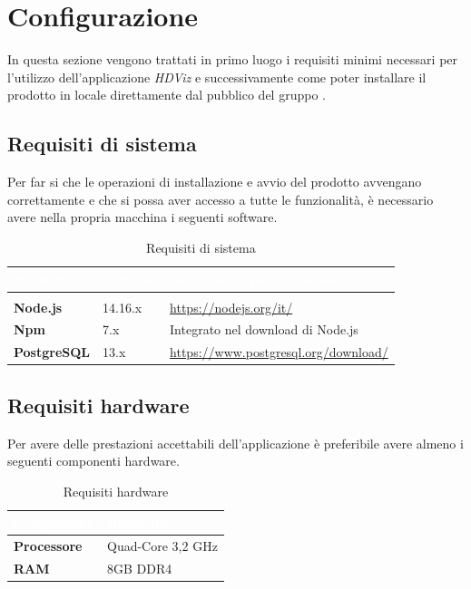 \section{Configurazione}
In questa sezione vengono trattati in primo luogo i requisiti minimi necessari per l'utilizzo dell'applicazione \textit{HDViz} e successivamente come poter installare il prodotto in locale direttamente dal  pubblico  del gruppo \Gruppo{}.  
\subsection{Requisiti di sistema}
Per far si che le operazioni di installazione e avvio del prodotto avvengano correttamente e che si possa aver accesso a tutte le funzionalità, è necessario avere nella propria macchina i seguenti software.
{
\setlength\arrayrulewidth{0.95pt}
\renewcommand{\arraystretch}{1.5}
\begin{longtable}{C{3cm} | C{3cm} | C{9cm}}

\textcolor{white}{\textbf{Software}}&
\textcolor{white}{\textbf{Versione}}&
\textcolor{white}{\textbf{Riferimento per il downlaod}} \\
\endfirsthead
{}\\
\endfoot
{}\caption{Requisiti di sistema}
\endlastfoot
	
	\textbf{Node.js} &
	14.16.x &
	\textcolor{blue}{\url{https://nodejs.org/it/}} \\
 
	\textbf{Npm} & 
	7.x &
	Integrato nel download di Node.js \\
	
	\textbf{PostgreSQL} &
	13.x &
	\textcolor{blue}{\url{https://www.postgresql.org/download/}} \\
\end{longtable}	

}
\subsection{Requisiti hardware}
Per avere delle prestazioni accettabili dell'applicazione è preferibile avere almeno i seguenti componenti hardware.
{
\setlength\arrayrulewidth{0.95pt}
\renewcommand{\arraystretch}{1.5}
\begin{longtable}{C{4cm} | C{4cm}}

\textcolor{white}{\textbf{Componente}}&
\textcolor{white}{\textbf{Requisito}} \\
\endfirsthead
\endfoot
{}\caption{Requisiti hardware}
\endlastfoot
	
	\textbf{Processore} &
	 Quad-Core 3,2 GHz \\
 
	\textbf{RAM} & 
	8GB DDR4 \\

\end{longtable}	
}

